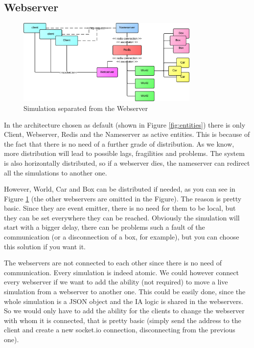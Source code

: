 \subsection{Webserver}

\begin{figure}[H]
\centering %
\includegraphics[width=0.8\textwidth]{./img/SystemAnalysis/EntitiesWebserver4everAlone.png}
\caption{Simulation separated from the Webserver}
\label{fig:entitiesWebserver4everAlone}
\end{figure}

In the architecture chosen as default (shown in Figure \ref{fig:entities}) there is only Client, Webserver, Redis and the Nameserver as active entities. This is because of the fact that there is no need of a further grade of distribution. As we know, more distribution will lead to possible lags, fragilities and problems. The system is also horizontally distributed, so if a webserver dies, the nameserver can redirect all the simulations to another one.

However, World, Car and Box can be distributed if needed, as you can see in Figure \ref{fig:entitiesWebserver4everAlone} (the other webservers are omitted in the Figure). The reason is pretty basic. Since they are event emitter, there is no need for them to be local, but they can be set everywhere they can be reached. Obviously the simulation will start with a bigger delay, there can be problems such a fault of the communication (or a disconnection of a box, for example), but you can choose this solution if you want it.

The webservers are not connected to each other since there is no need of communication. Every simulation is indeed atomic. We could however connect every webserver if we want to add the ability (not required) to move a live simulation from a webserver to another one. This could be easily done, since the whole simulation is a JSON object and the IA logic is shared in the webservers. So we would only have to add the ability for the clients to change the webserver with whom it is connected, that is pretty basic (simply send the address to the client and create a new socket.io connection, disconnecting from the previous one).


